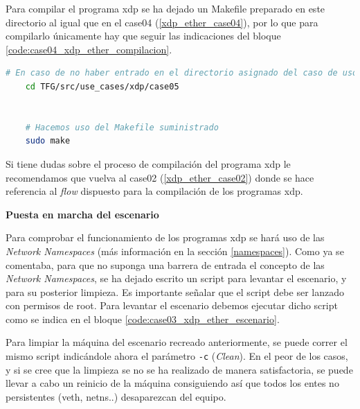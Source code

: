Para compilar el programa \gls{xdp} se ha dejado un Makefile preparado en este directorio al igual que en el case04 (\ref{xdp_ether_case04}), por lo que para compilarlo únicamente hay que seguir las indicaciones del bloque \ref{code:case04_xdp_ether_compilacion}.

\begin{lstlisting}[language= bash, style=Consola, caption={Compilación programa XDP - Case05},label=code:case05_xdp_ether_compilacion]
    # En caso de no haber entrado en el directorio asignado del caso de uso
    cd TFG/src/use_cases/xdp/case05
    
    
    # Hacemos uso del Makefile suministrado 
    sudo make
\end{lstlisting}
\vspace{0.5cm}

Si tiene dudas sobre el proceso de compilación del programa \gls{xdp} le recomendamos que vuelva al case02 (\ref{xdp_ether_case02}) donde se hace referencia al \textit{flow} dispuesto para la compilación de los programas \gls{xdp}.


\vspace{1cm}
\textbf{Puesta en marcha del escenario}\\
\par

Para comprobar el funcionamiento de los programas \gls{xdp} se hará uso de las \textit{Network Namespaces} (más información en la sección \ref{namespaces}). Como ya se comentaba, para que no suponga una barrera de entrada el concepto de las \textit{Network Namespaces}, se ha dejado escrito un script para levantar el escenario, y para su posterior limpieza. Es importante señalar que el script debe ser lanzado con permisos de root. Para levantar el escenario debemos ejecutar dicho script como se indica en el bloque \ref{code:case03_xdp_ether_escenario}.\\
\par
Para limpiar la máquina del escenario recreado anteriormente, se puede correr el mismo script indicándole ahora el parámetro \texttt{-c} (\textit{Clean}). En el peor de los casos, y si se cree que la limpieza se no se ha realizado de manera satisfactoria, se puede llevar a cabo un reinicio de la máquina consiguiendo así que todos los entes no persistentes (\gls{veth}, netns..) desaparezcan del equipo.

